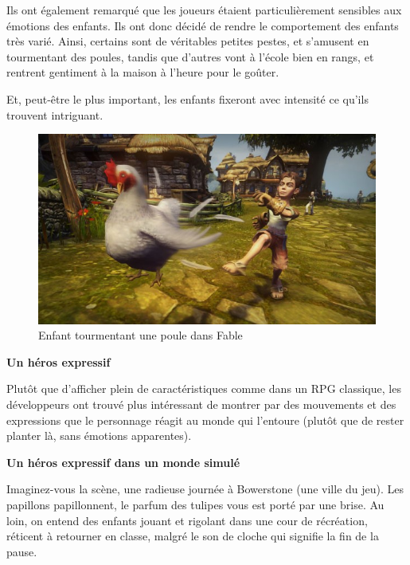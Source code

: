 \documentclass[a4paper, 12pt]{article} %
\begin{document}

Ils ont également remarqué que les joueurs étaient particulièrement sensibles aux émotions des enfants. Ils ont donc décidé de rendre le comportement des enfants très varié. Ainsi, certains sont de véritables petites pestes, et s'amusent en tourmentant des poules, tandis que d’autres vont à l’école bien en rangs, et rentrent gentiment à la maison à l’heure pour le goûter.

Et, peut-être le plus important, les enfants fixeront avec intensité ce qu’ils trouvent intriguant.

\begin{figure}[!h]%
	\begin{center} 
		\includegraphics[width=0.40\columnwidth]{images/chicken.jpg}%
		\caption{Enfant tourmentant une poule dans Fable}%
	\end{center}
\end{figure}

\textbf{Un héros expressif}

Plutôt que d’afficher plein de caractéristiques comme dans un RPG classique, les développeurs ont trouvé plus intéressant de montrer par des mouvements et des expressions que le personnage réagit au monde qui l’entoure (plutôt que de rester planter là, sans émotions apparentes).

\newpage
\textbf{Un héros expressif dans un monde simulé}


Imaginez-vous la scène, une radieuse journée à Bowerstone (une ville du jeu). Les papillons papillonnent, le parfum des tulipes vous est porté par une brise. Au loin, on entend des enfants jouant et rigolant dans une cour de récréation, réticent à retourner en classe, malgré le son de cloche qui signifie la fin de la pause.
\end{document}
